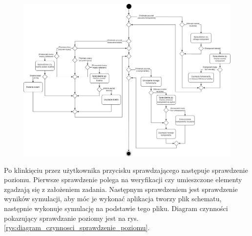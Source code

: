 \documentclass[12pt,a4paper]{article} %
\begin{document}
\begin{figure}[h]
	\centering
	\includegraphics[width=17cm]{images/diagramy_czynnosci/plan-diagram_czynnosci_realizacja_poziomu.png}
	\caption{}
	\label{rys:diagram_czynnosci_realizacja_poziomu}
\end{figure}

\aka Po klinkięciu przez użytkownika przycisku sprawdzającego następuje sprawdzenie poziomu. Pierwsze sprawdzenie polega na weryfikacji czy umieszczone elementy zgadzają się z założeniem zadania. Następnym sprawdzeniem jest sprawdzenie wyników symulacji, aby móc je wykonać aplikacja tworzy plik schematu, następnie wykonuje symulację na podstawie tego pliku. Diagram czynności pokazujący sprawdzanie poziomy jest na rys. \ref{rys:diagram_czynnosci_sprawdzenie_poziomu}.
\end{document}
